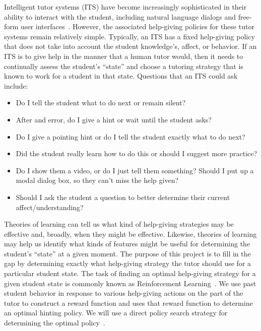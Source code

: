 \documentclass{edm_template}
\begin{document}
Intelligent tutor systems (ITS) have become increasingly
sophisticated in their ability to interact with the student, including
natural language dialogs and free-form user interfaces~\cite{vanlehn_behavior_2006}.  However, the associated
help-giving policies for these tutor systems remain relatively simple.
Typically, an ITS has a fixed help-giving policy that does not take
into account the student knowledge's, affect, or behavior.
If an ITS is to give help in the manner that a human tutor would, then
it needs to continually assess the student's ``state'' and choose a tutoring strategy
that is known to work for a student in that state.
Questions that an ITS could ask include:
%
\label{intro}
\begin{itemize}

   \item Do I tell the student what to do next or remain silent?

   \item After and error, do I give a hint or wait until the student asks?

   \item Do I give a pointing hint or do I tell the student 
         exactly what to do next?

   \item Did the student really learn how to do this or should
         I suggest more practice?

   \item Do I show them a video, or do I just tell them something?
         Should I put up a modal dialog box, so they can't miss the
         help given?

   \item Should I ask the student a question to better determine their 
         current affect/understanding?

\end{itemize}

Theories of learning can tell us what kind of help-giving
strategies may be effective and, broadly, when they might be effective.
Likewise, theories of learning may help us identify what kinds of 
features might be useful for determining the student's ``state'' at
a given moment.  The purpose of this project is to fill in the gap
by determining exactly what help-giving strategy the tutor should use for a 
particular student state.
The task of finding an optimal help-giving strategy for a
given student state is commonly known as 
Reinforcement Learning~\cite{kaelbling_reinforcement_1996}.
We use past student behavior in response to various help-giving
actions on the part of the tutor to construct a reward function
and uses that reward function to determine an optimal hinting policy.
We will use a direct policy search strategy for determining the optimal
policy~\cite{rosenstein_robot_2001}.
\end{document}
